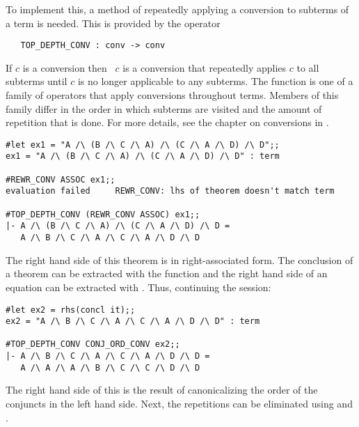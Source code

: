 To implement this, a method of repeatedly applying a conversion to
subterms of a term is needed. This is provided by the operator

\begin{hol}\begin{verbatim}
   TOP_DEPTH_CONV : conv -> conv
\end{verbatim}\end{hol}

\noindent If $c$ is a conversion then ~$c$ is a
conversion that repeatedly applies $c$ to all subterms until $c$ is no
longer applicable to any subterms. The function 
is one of a family of operators that apply conversions throughout
terms. Members of this family differ in the order in which subterms
are visited and the amount of repetition that is done. For more
details, see the chapter on conversions in \DESCRIPTION.

\begin{session}\begin{verbatim}
#let ex1 = "A /\ (B /\ C /\ A) /\ (C /\ A /\ D) /\ D";;
ex1 = "A /\ (B /\ C /\ A) /\ (C /\ A /\ D) /\ D" : term

#REWR_CONV ASSOC ex1;;
evaluation failed     REWR_CONV: lhs of theorem doesn't match term

#TOP_DEPTH_CONV (REWR_CONV ASSOC) ex1;;
|- A /\ (B /\ C /\ A) /\ (C /\ A /\ D) /\ D =
   A /\ B /\ C /\ A /\ C /\ A /\ D /\ D
\end{verbatim}\end{session}

\noindent The right hand side of this theorem is  in right-associated
form. The conclusion of a theorem can be extracted with the \ML{} function
 and the right hand side of an equation can be extracted with
. Thus, continuing the session:

\begin{session}\begin{verbatim}
#let ex2 = rhs(concl it);;
ex2 = "A /\ B /\ C /\ A /\ C /\ A /\ D /\ D" : term

#TOP_DEPTH_CONV CONJ_ORD_CONV ex2;;
|- A /\ B /\ C /\ A /\ C /\ A /\ D /\ D =
   A /\ A /\ A /\ B /\ C /\ C /\ D /\ D
\end{verbatim}\end{session}

\noindent The right hand side of this is the result of canonicalizing
the order of the conjuncts in the left hand side. Next, the repetitions
can be eliminated using  and .

